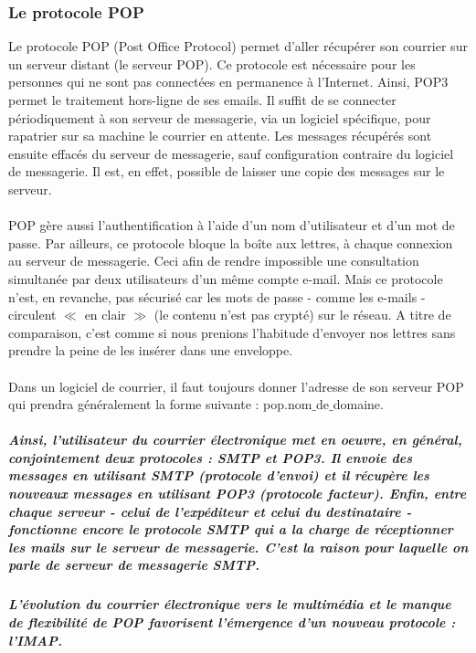 \documentclass[french]{report}
\begin{document}
\subsubsection{\LARGE Le protocole POP }
\LARGE Le protocole POP (Post Office Protocol) permet d'aller récupérer son courrier sur un serveur distant (le serveur POP). Ce protocole est nécessaire pour les personnes qui ne sont pas connectées en permanence à l'Internet. Ainsi, POP3 permet le traitement hors-ligne de ses emails. Il suffit de se connecter périodiquement à son serveur de messagerie, via un logiciel spécifique, pour rapatrier sur sa machine le courrier en attente. Les messages récupérés sont ensuite effacés du serveur de messagerie, sauf configuration contraire du logiciel de messagerie. Il est, en effet, possible de laisser une copie des messages sur le serveur.\\ \\
POP gère aussi l'authentification à l'aide d'un nom d'utilisateur et d'un mot de passe. Par ailleurs, ce protocole bloque la boîte aux lettres, à chaque connexion au serveur de messagerie. Ceci afin de rendre impossible une consultation simultanée par deux utilisateurs d'un même compte e-mail.
Mais ce protocole n'est, en revanche, pas sécurisé car les mots de passe - comme les e-mails - circulent $\ll$ en clair $\gg$ (le contenu n'est pas crypté) sur le réseau. A titre de comparaison, c'est comme si nous prenions l'habitude d'envoyer nos lettres sans prendre la peine de les insérer dans une enveloppe.\\ \\
Dans un logiciel de courrier, il faut toujours donner l'adresse de son serveur POP qui prendra généralement la forme suivante : pop.nom$\_$de$\_$domaine.

\subparagraph{\LARGE Ainsi, l'utilisateur du courrier électronique met en oeuvre, en général, conjointement deux protocoles : SMTP et POP3. Il envoie des messages en utilisant SMTP (protocole d'envoi) et il récupère les nouveaux messages en utilisant POP3 (protocole facteur). Enfin, entre chaque serveur - celui de l'expéditeur et celui du destinataire - fonctionne encore le protocole SMTP qui a la charge de réceptionner les mails sur le serveur de messagerie. C'est la raison pour laquelle on parle de serveur de messagerie SMTP.}
\subparagraph{
\LARGE L'évolution du courrier électronique vers le multimédia et le manque de flexibilité de POP favorisent l'émergence d'un nouveau protocole : l'IMAP.}
\end{document}
